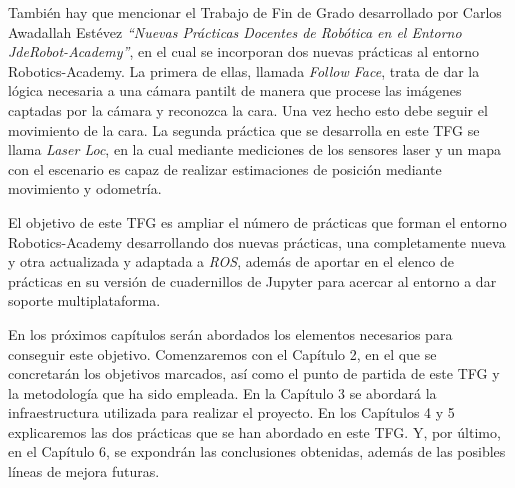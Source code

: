 También hay que mencionar el Trabajo de Fin de Grado desarrollado por Carlos Awadallah Estévez \textit{“Nuevas Prácticas Docentes de Robótica en el  Entorno JdeRobot-Academy”}\cite{tfg3}, en el cual se incorporan dos nuevas prácticas al entorno Robotics-Academy. La primera de ellas, llamada \textit{Follow Face}, trata de dar la lógica necesaria a una cámara pantilt de manera que procese las imágenes captadas por la cámara y reconozca la cara. Una vez hecho esto debe seguir el movimiento de la cara. La segunda práctica que se desarrolla en este TFG se llama \textit{Laser Loc}, en la cual mediante mediciones de los sensores laser y un mapa con el escenario es capaz de realizar estimaciones de posición mediante movimiento y odometría.

\vspace{4cm}

El objetivo de este TFG es ampliar el número de prácticas que forman el entorno Robotics-Academy desarrollando dos nuevas prácticas, una completamente nueva y otra actualizada y adaptada a \textit{ROS}, además de aportar en el elenco de prácticas en su versión de cuadernillos de Jupyter para acercar al entorno a dar soporte multiplataforma.

En los próximos capítulos serán abordados los elementos necesarios para conseguir este objetivo. Comenzaremos con el Capítulo 2, en el que se concretarán los objetivos marcados, así como el punto de partida de este TFG y la metodología que ha sido empleada. En la Capítulo 3 se abordará la infraestructura utilizada para realizar el proyecto. En los Capítulos 4 y 5 explicaremos las dos prácticas que se han abordado en este TFG. Y, por último, en el Capítulo 6, se expondrán las conclusiones obtenidas, además de las posibles líneas de mejora futuras.

